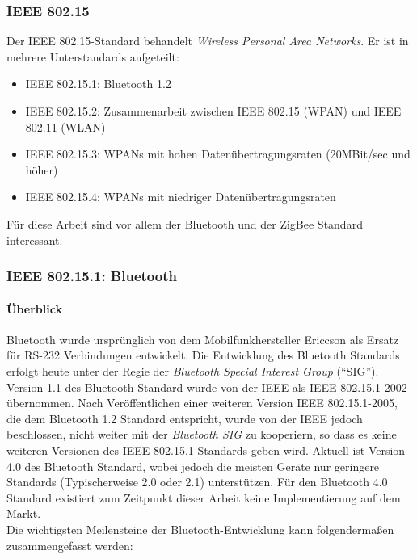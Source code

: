     \subsubsection{IEEE 802.15}
        Der IEEE 802.15-Standard behandelt \textsl{Wireless Personal Area Networks}. Er ist in mehrere Unterstandards
        aufgeteilt:

         \begin{itemize}
            \item{IEEE 802.15.1:} Bluetooth 1.2
            \item{IEEE 802.15.2:} Zusammenarbeit zwischen IEEE 802.15 (WPAN) und IEEE 802.11 (WLAN)
            \item{IEEE 802.15.3:} WPANs mit hohen Datenübertragungsraten (20MBit/sec und höher)
            \item{IEEE 802.15.4:} WPANs mit niedriger Datenübertragungsraten
        \end{itemize}

        Für diese Arbeit sind vor allem der Bluetooth und der ZigBee Standard interessant. 

    \subsubsection{IEEE 802.15.1: Bluetooth}
        \paragraph{Überblick}
            Bluetooth wurde ursprünglich von dem Mobilfunkhersteller Ericcson als Ersatz für
            RS-232 Verbindungen entwickelt. Die Entwicklung des Bluetooth Standards erfolgt
            heute unter der Regie der \textsl{Bluetooth Special Interest Group} ("`SIG"').
            Version 1.1 des Bluetooth Standard wurde 
            von der IEEE als IEEE 802.15.1-2002 übernommen. Nach Veröffentlichen einer
            weiteren Version IEEE 802.15.1-2005, die dem Bluetooth 1.2 Standard entspricht,
            wurde von der IEEE jedoch beschlossen, nicht weiter mit der \textsl{Bluetooth SIG}
            zu kooperiern, so dass es keine weiteren Versionen des IEEE 802.15.1 Standards 
            geben wird. Aktuell ist Version 4.0 des Bluetooth Standard, wobei jedoch die
            meisten Geräte nur geringere Standards (Typischerweise 2.0 oder 2.1) unterstützen.
            Für den Bluetooth 4.0 Standard existiert zum Zeitpunkt dieser Arbeit keine 
            Implementierung auf dem Markt.\\
            Die wichtigsten Meilensteine der Bluetooth-Entwicklung kann folgendermaßen
            zusammengefasst werden:

